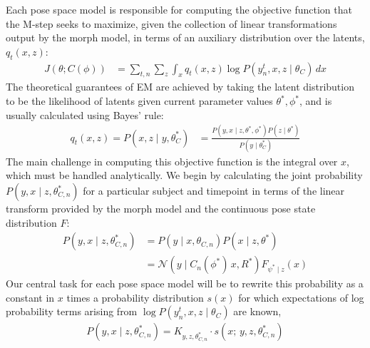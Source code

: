 \documentclass{article}         %
\newcommand{\NN}{\mathcal{N}}
\begin{document}
Each pose space model is responsible for computing the objective function that the M-step seeks to maximize, given the collection of linear transformations output by the morph model, in terms of an auxiliary distribution over the latents, $q_t(x, z)$:
\begin{align}
    J(\theta; C(\phi)) &= \sum_{t, n}\sum_z \int_x q_t(x, z) \log P(y^t_n, x, z \mid \theta_C) \, dx 
    \label{eq:obj-general}
\end{align}
The theoretical guarantees of EM are achieved by taking the latent distribution to be the likelihood of latents given current parameter values $\theta^*, \phi^*$, and is usually calculated using Bayes' rule:
\begin{align}
    q_t(x, z) = P(x, z \mid y, \theta_C^*) &= \frac{P(y, x \mid z, \theta^*, \phi^*) P(z\mid \theta^*)}{P(y \mid \theta_C^*)}
    \label{eq:q-general}
\end{align}
The main challenge in computing this objective function is the integral over $x$, which must be handled analytically. We begin by calculating the joint probability $P(y, x \mid z, \theta_{C,n}^*)$ for a particular subject and timepoint in terms of the linear transform provided by the morph model and the continuous pose state distribution $F$:
\begin{align}
    P(y, x \mid z, \theta_{C, n}^*) &= P(y \mid x, \theta_{C, n}) P(x\mid z, \theta^*) \\
    &= \NN(y\mid C_n(\phi^*)\, x, R^*) F_{\psi^*\mid z}(x) \label{eq:norm-F-prod}
\end{align}
Our central task for each pose space model will be to rewrite this probability as a constant in $x$ times a probability distribution $s(x)$ for which expectations of log probability terms arising from $\log P(y^t_n, x, z \mid \theta_C)$ are known,
\begin{align}
    P(y, x \mid z, \theta^*_{C, n}) = K_{y, z, \theta^*_{C, n}}\cdot s(x;\, y, z, \theta^*_{C, n})
    \label{eq:s-defn}
\end{align}
\end{document}
